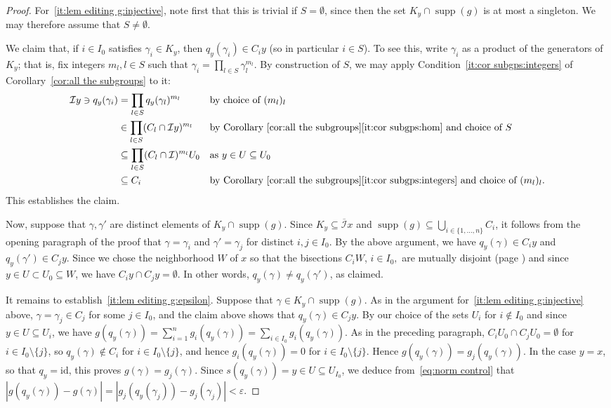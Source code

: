 \documentclass[a4paper, 12pt]{amsart}
\theoremstyle{plain}
\theoremstyle{definition}
\theoremstyle{remark}
\newcommand{\supp}{\operatorname{supp}}
\newcommand{\Ii}{\mathcal{I}}
\newcommand{\Iicl}{\overline{\mathcal{I}}}
\numberwithin{equation}{section}
\begin{document}
\begin{proof}
For~\ref{it:lem editing g:injective}, note first that this is trivial if
$S=\emptyset$, since then the set $K_y\cap \supp(g)$ is at most a singleton.
We may therefore assume that $S\neq\emptyset$.

We claim that, if $i\in I_0$ satisfies $\gamma_i\in K_y$, then
$q_{y}(\gamma_i)\in C_i y$ (so in particular $i\in S$). To see this, write
$\gamma_i$ as a product of the generators of $K_{y}$;
that is, fix integers $m_l, l\in S$ such that
$\gamma_{i}=\prod_{l\in S}\gamma_l^{m_l}$. By construction of $S$, we may
apply Condition~\ref{it:cor subgps:integers} of Corollary~\ref{cor:all the
subgroups} to it:
 \begin{align*}
         \Ii y\ni q_{y}(\gamma_i)
        &=
        \prod_{l\in S} q_{y}( \gamma_l)^{m_l}
        &&\text{by choice of }(m_l)_l
        \\
        &\in
        \prod_{l \in S} (C_l \cap   \Ii y)^{m_l}
        &&\text{by Corollary~\ref{cor:all the subgroups}\ref{it:cor subgps:hom} and choice of $S$}
        \\
        &\subseteq
        \prod_{l \in S} (C_l \cap \Ii)^{m_l} U_0
        &&\text{as }y\in U \subseteq U_0
        \\
        &\subseteq C_i
        &&\text{by Corollary~\ref{cor:all the subgroups}\ref{it:cor subgps:integers} and choice of $(m_{l})_l$}.
\end{align*}
This establishes the claim.

Now, suppose that $\gamma, \gamma'$ are distinct elements of $K_y \cap
\supp(g)$. Since $K_y \subseteq \Iicl x$ and $\supp(g)\subseteq
\bigcup_{i\in\{1,\ldots,n\}} C_i$, it follows from the opening paragraph of
the proof that $\gamma = \gamma_i$ and $\gamma' = \gamma_j$ for distinct
$i, j \in I_0$. By the above argument, we have $q_{y}(\gamma)\in C_i y$ and
$q_{y}(\gamma')\in C_j y$. Since we chose the neighborhood $W$ of $x$ so that
the bisections $C_i W$, $i \in I_0,$ are mutually disjoint (page
\pageref{page:C_i W mutually disjoint}) and since $y\in U\subset U_0\subseteq
W$, we have $C_i y \cap C_j y = \emptyset$. In other words,
$q_{y}(\gamma)\neq q_{y}(\gamma')$, as claimed.

It remains to establish~\ref{it:lem editing g:epsilon}. Suppose that $\gamma
\in K_y \cap \supp(g)$. As in the argument for~\ref{it:lem editing
g:injective} above, $\gamma = \gamma_j \in C_j$ for some $j \in I_0$, and the
claim above shows that $q_y(\gamma) \in C_j y$. By our choice of the sets
$U_i$ for $i \not\in I_0$ and since $y\in U\subseteq U_i$, we have
$g(q_y(\gamma)) = \sum^n_{i=1} g_i(q_y(\gamma)) = \sum_{i \in I_0}
g_i(q_y(\gamma))$. As in the preceding paragraph, $C_i U_0 \cap C_j U_0 =
\emptyset$ for $i \in I_0 \setminus \{j\}$, so $q_y(\gamma) \not\in C_i$ for
$i \in I_0 \setminus \{j\}$, and hence $g_i(q_y(\gamma)) = 0$ for $i \in I_0
\setminus \{j\}$. Hence $g(q_y(\gamma)) = g_j(q_y(\gamma))$. In the case
$y=x$, so that $q_y=\mathrm{id}$, this proves $g(\gamma) = g_j(\gamma)$.
Since $s(q_{y}(\gamma))=y\in U\subseteq U_{I_0}$, we deduce
from~\eqref{eq:norm control} that $|g(q_y(\gamma)) - g(\gamma)|=
|g_j(q_y(\gamma_j)) - g_j(\gamma_j)| < \varepsilon$.
\end{proof}
\end{document}
